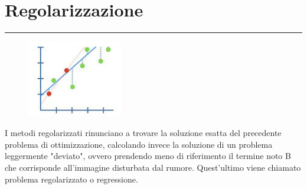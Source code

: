 {\color{ggreen}\section{Regolarizzazione}}
\textcolor{ggreen}{\rule[5pt]{\textwidth}{1pt}}

\begin{figure}
	\centering
	\includegraphics[width=0.370\textwidth]{IMMAGINI_RELAZIONE/Regolarizzazione.jpg}
\end{figure}

I metodi regolarizzati rinunciano a trovare la soluzione esatta del 
precedente problema di ottimizzazione, calcolando invece la soluzione di un problema leggermente "deviato",  
ovvero prendendo meno di riferimento il termine noto B che corrisponde all'immagine disturbata dal rumore. 
Quest’ultimo viene chiamato problema regolarizzato o regressione.
